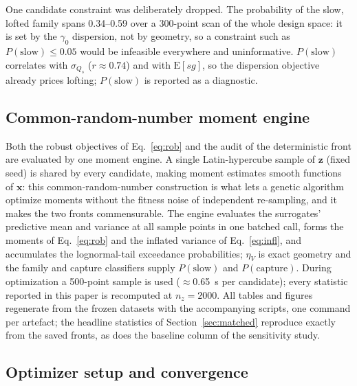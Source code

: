 One candidate constraint was deliberately dropped. The probability of the
slow, lofted family spans 0.34--0.59 over a 300-point scan of the whole
design space: it is set by the $\gamma_0$ dispersion, not by geometry, so a
constraint such as $P(\text{slow})\le0.05$ would be infeasible everywhere
and uninformative. $P(\text{slow})$ correlates with $\sigma_{Q_s}$
($r\approx0.74$) and with $\mathrm{E}[sg]$, so the dispersion objective
already prices lofting; $P(\text{slow})$ is reported as a diagnostic.

\subsection{Common-random-number moment engine}
\label{sec:engine}

Both the robust objectives of Eq.~\eqref{eq:rob} and the audit of the
deterministic front are evaluated by one moment engine. A single
Latin-hypercube sample of $\mathbf{z}$ (fixed seed) is shared by every
candidate, making moment estimates smooth functions of $\mathbf{x}$: this
common-random-number construction is what lets a genetic algorithm optimize
moments without the fitness noise of independent re-sampling, and it makes
the two fronts commensurable. The engine evaluates the surrogates'
predictive mean and variance at all sample points in one batched call,
forms the moments of Eq.~\eqref{eq:rob} and the inflated
variance of Eq.~\eqref{eq:infl}, and accumulates the lognormal-tail
exceedance probabilities; $\eta_V$ is exact geometry and the family and
capture classifiers supply $P(\text{slow})$ and $P(\text{capture})$. During
optimization a 500-point sample is used ($\approx$0.65~s per candidate);
every statistic reported in this paper is recomputed at $n_z=2000$.
All tables and figures regenerate from the frozen datasets with the
accompanying scripts, one command per artefact; the headline statistics
of Section~\ref{sec:matched} reproduce exactly from the saved fronts, as
does the baseline column of the sensitivity study.

\subsection{Optimizer setup and convergence}
\label{sec:optimizer}

